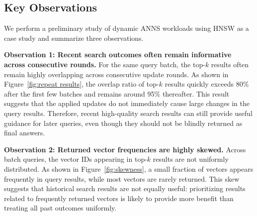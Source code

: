 



\subsection{Key Observations}

We perform a preliminary study of dynamic ANNS workloads using HNSW as a case study and summarize three observations.

\noindent\textbf{Observation 1: Recent search outcomes often remain informative across consecutive rounds.} For the same query batch, the top-$k$ results often remain highly overlapping across consecutive update rounds. 
As shown in Figure~\ref{fig:repeat results}, the 
overlap ratio of top-$k$ results quickly exceeds 80\% after the first few batches and remains around 95\% thereafter. This result suggests that the applied updates do not immediately cause large 
changes in the query results. Therefore, recent high-quality search results can still provide useful guidance for later queries, even though they should not be blindly returned as final answers.



\noindent\textbf{Observation 2: Returned vector frequencies are highly skewed.}
Across batch queries, the vector IDs appearing in top-$k$ results are not uniformly distributed. As shown in Figure~\ref{fig:skewness}, a small fraction of vectors appears frequently in query results, while most vectors are rarely returned.
This skew suggests that historical search results are not equally useful: prioritizing results related to frequently returned vectors is likely to provide more benefit than treating all past outcomes uniformly.

